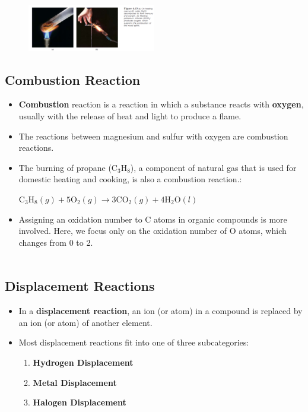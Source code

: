 \documentclass[a4paper,12pt,twocolumn]{article}
\begin{document}
\begin{figure}[h]
\centering
\includegraphics[width=0.5\textwidth]{decomposition.png}
\end{figure}

\subsection{Combustion Reaction}
\begin{itemize}
\item \textbf{Combustion} reaction is a reaction in which a substance reacts with \textbf{oxygen}, usually with the release of heat and light to produce a flame. 
\item The reactions between magnesium and sulfur with oxygen are combustion reactions.
\item The burning of propane ($\mathrm{C_3H_8}$), a component of natural gas that is used for domestic heating and cooking, is also a combustion reaction.:
\begin{Box1}{}
$\mathrm{C}_{3} \mathrm{H}_{8}(g)+5 \mathrm{O}_{2}(g) \longrightarrow 3 \mathrm{CO}_{2}(g)+4 \mathrm{H}_{2} \mathrm{O}(l)$
\end{Box1}
\item Assigning an oxidation number to C atoms in organic compounds is more involved. Here, we focus only on the oxidation number of O atoms, which changes from 0 to 2.
\\
\\
\end{itemize}

\subsection{Displacement Reactions}
\begin{itemize}
\item In a \textbf{displacement reaction}, an ion (or atom) in a compound is replaced by an ion (or atom) of another element.
\item Most displacement reactions fit into one of three subcategories:
      \begin{enumerate}
      \item \textbf{Hydrogen Displacement}
      \item \textbf{Metal Displacement}
      \item \textbf{Halogen Displacement}

      \end{enumerate}
\end{itemize}
\end{document}
